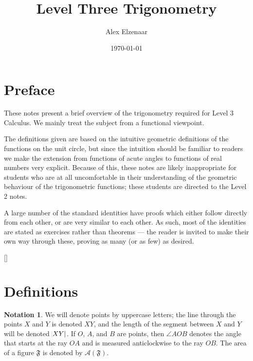 \documentclass[a4paper,leqno]{article}
\title{Level Three Trigonometry}
\author{Alex Elzenaar}
\date{\today}
\numberwithin{equation}{section}
\theoremstyle{definition}
\newtheorem{notation}[equation]{Notation}
\theoremstyle{remark}
\begin{document}
\maketitle
\tableofcontents
\section*{Preface}
These notes present a brief overview of the trigonometry required for Level 3 Calculus. We
mainly treat the subject from a functional viewpoint.

The definitions given are based on the intuitive geometric definitions of the functions on
the unit circle, but since the intuition should be familiar to readers we make the extension
from functions of acute angles to functions of real numbers very explicit. Because of this, these
notes are likely inappropriate for students who are at all uncomfortable in their understanding of
the geometric behaviour of the trigonometric functions; these students are directed to the
Level 2 notes.

A large number of the standard identities have proofs which either follow directly from each other,
or are very similar to each other. As such, most of the identities are stated as exercises rather
than theorems --- the reader is invited to make their own way through these, proving as many (or
as few) as desired.

[{\titlerule[0.8pt]}]
\let\oldsection\section
\renewcommand\section{\clearpage\oldsection}
\section{Definitions}
\begin{notation}
  We will denote points by uppercase letters; the line through the points $ X $ and $ Y $ is denoted $ XY $, and the length of the
  segment between $ X $ and $ Y $ will be denoted $ \abs{XY} $. If $ O $, $ A $, and $ B $ are points, then $ \angle AOB $ denotes
  the angle that starts at the ray $ OA $ and is measured anticlockwise to the ray $ OB $. The area of a figure $ \mathfrak{F} $ is
  denoted by $ \mathcal{A}(\mathfrak{F}) $.
\end{notation}
\end{document}
